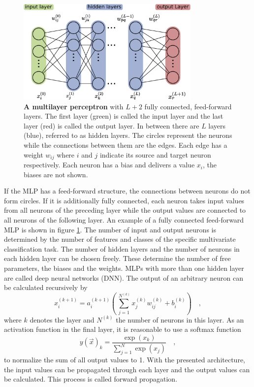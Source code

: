\begin{figure}
\centering
\includegraphics[width=0.8\textwidth]{assets/ann_3.png}
\caption[Multilayer Perceptron]{\textbf{A multilayer perceptron} with $L+2$ fully connected, feed-forward layers. The first layer (green) is called the input layer and the last layer (red) is called the output layer. In between there are $L$ layers (blue), referred to as hidden layers.  The circles represent the neurons while the connections between them are the edges. Each edge has a weight $w_{ij}$ where $i$ and $j$ indicate its source and target neuron respectively. Each neuron has a bias and delivers a value $x_i$, the biases are not shown.}
\label{fig:ch_4_dnn}
\end{figure}
If the MLP has a feed-forward structure, the connections between neurons do not form circles. If it is additionally fully connected, each neuron takes input values from all neurons of the preceding layer while the output values are connected to all neurons of the following layer. An example of a fully connected feed-forward MLP is shown in figure \ref{fig:ch_4_dnn}. The number of input and output neurons is determined by the number of features and classes of the specific multivariate classification task. The number of hidden layers and the number of neurons in each hidden layer can be chosen freely. These determine the number of free parameters, the biases and the weights. MLPs with more than one hidden layer are called deep neural networks (DNN). The output of an arbitrary neuron can be calculated recursively by 
\begin{equation}
x_i^{(k+1)} = a^{(k+1)}_i \left( \sum_{j=1}^{\ N^{(k)}} x_j^{(k)} w_{ij}^{(k)} + b_{i}^{(k)} \right) \quad ,  
\end{equation}
where $k$ denotes the layer and $N^{(k)}$ the number of neurons in this layer. As an activation function in the final layer, it is reasonable to use a softmax function
\begin{equation}\label{eq:ch4_NN_softmax}
y(\vec{x})_k = \frac{\exp(x_k)}{\sum_{j=1}^N \exp(x_j)}	\quad ,
\end{equation}
to normalize the sum of all output values to 1. With the presented architecture, the input values can be propagated through each layer and the output values can be calculated. This process is called forward propagation. 


